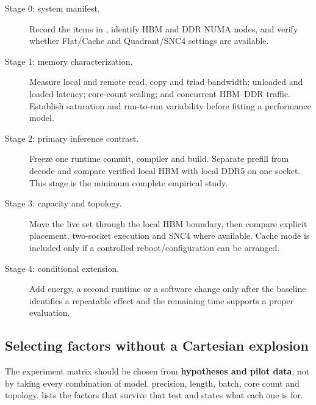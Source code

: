 \begin{description}
  \item[Stage 0: system manifest.] Record the items in
  , identify HBM and DDR NUMA nodes, and
  verify whether Flat/Cache and Quadrant/SNC4 settings are available.

  \item[Stage 1: memory characterization.] Measure local and remote read,
  copy and triad bandwidth; unloaded and loaded latency; core-count
  scaling; and concurrent HBM--DDR traffic.  Establish saturation and
  run-to-run variability before fitting a performance model.

  \item[Stage 2: primary inference contrast.] Freeze one runtime commit,
  compiler and build.  Separate prefill from decode and compare verified
  local HBM with local DDR5 on one socket.  This stage is the minimum
  complete empirical study.

  \item[Stage 3: capacity and topology.] Move the live set through the
  local HBM boundary, then compare explicit placement, two-socket
  execution and SNC4 where available.  Cache mode is included only if a
  controlled reboot/configuration can be arranged.

  \item[Stage 4: conditional extension.] Add energy, a second runtime or
  a software change only after the baseline identifies a repeatable
  effect and the remaining time supports a proper evaluation.
\end{description}

\subsection{Selecting factors without a Cartesian explosion}

The experiment matrix should be chosen from \textbf{hypotheses and
pilot data}, not by taking every combination of model, precision,
length, batch, core count and topology.   lists the
factors that survive that test and states what each one is for.


